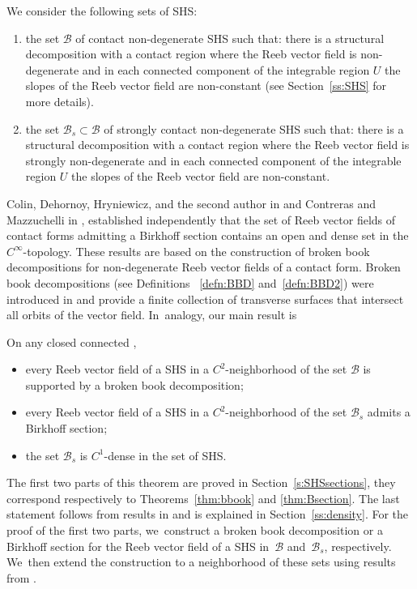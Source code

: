 We consider the following sets of SHS:
\begin{enumerate}
\item the set $\mathcal{B}$ of contact non-degenerate SHS such that: there is a structural decomposition with a contact region where the Reeb vector field is non-degenerate and in each connected component of the integrable region $U$ the slopes of the Reeb vector field are non-constant (see Section~\ref{ss:SHS} for more details).
\item the set $\mathcal{B}_s\subset \mathcal{B}$ of strongly contact non-degenerate SHS such that: there is a structural decomposition with a contact region where the Reeb vector field is strongly non-degenerate and in each connected component of the integrable region $U$ the slopes of the Reeb vector field are non-constant.
\end{enumerate}

Colin, Dehornoy, Hryniewicz, and the second author in \cite{CDHR} and Contreras and Mazzuchelli in \cite{CM}, established independently that the set
of Reeb vector fields of contact forms admitting a Birkhoff section contains an open and dense set in the $C^\infty$\nobreakdash-topology. These results are based on the construction of broken book decompositions for non-degenerate Reeb vector fields of a contact form. Broken book decompositions (see Definitions ~\ref{defn:BBD} and~\ref{defn:BBD2}) were introduced in \cite{CDR} and provide a finite collection of transverse surfaces that intersect all orbits of the vector field. In~analogy, our main result is

\begin{thm}\label{thm:mainBirk}
On any closed connected \threemanifold,
\begin{itemize}
\item
every Reeb vector field of a SHS in a $C^2$-neighborhood of the set $\mathcal{B}$ is supported by a broken book decomposition;
\item
every Reeb vector field of a SHS in a $C^2$-neighborhood of the set $\mathcal{B}_s$ admits a Birkhoff section;
\item
the set $\mathcal{B}_s$ is $C^1$-dense in the set of SHS.
\end{itemize}
\end{thm}

The first two parts of this theorem are proved in Section~\ref{s:SHSsections}, they correspond respectively to Theorems~\ref{thm:bbook} and \ref{thm:Bsection}.
The last statement follows from results in \cite{CV1} and is explained in Section~\ref{ss:density}. For the proof of the first two parts, we~construct a broken book decomposition or a Birkhoff section for the Reeb vector field of a SHS in~$\mathcal{B}$ and~$\mathcal{B}_s$, respectively. We~then extend the construction to a neighborhood of these sets using results from \cite{CV2}.

